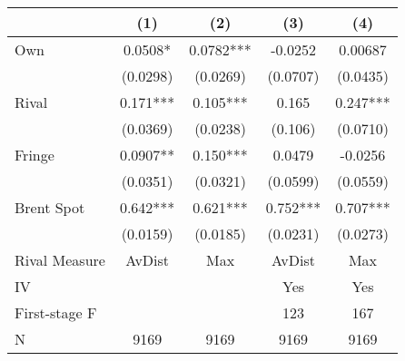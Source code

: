 {
\def\sym#1{\ifmmode^{#1}\else\(^{#1}\)\fi}
\begin{tabular}{l*{4}{c}}
\toprule
                &\multicolumn{1}{c}{(1)}   &\multicolumn{1}{c}{(2)}   &\multicolumn{1}{c}{(3)}   &\multicolumn{1}{c}{(4)}   \\
\midrule
Own             &   0.0508*  &   0.0782***&  -0.0252   &  0.00687   \\
                & (0.0298)   & (0.0269)   & (0.0707)   & (0.0435)   \\
\addlinespace
Rival           &    0.171***&    0.105***&    0.165   &    0.247***\\
                & (0.0369)   & (0.0238)   &  (0.106)   & (0.0710)   \\
\addlinespace
Fringe          &   0.0907** &    0.150***&   0.0479   &  -0.0256   \\
                & (0.0351)   & (0.0321)   & (0.0599)   & (0.0559)   \\
\addlinespace
Brent Spot      &    0.642***&    0.621***&    0.752***&    0.707***\\
                & (0.0159)   & (0.0185)   & (0.0231)   & (0.0273)   \\
\midrule
Rival Measure   &   AvDist   &      Max   &   AvDist   &      Max   \\
IV              &            &            &      Yes   &      Yes   \\
First-stage F   &            &            &      123   &      167   \\
N               &     9169   &     9169   &     9169   &     9169   \\
\bottomrule
\end{tabular}
}
